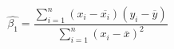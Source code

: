 \documentclass[preview]{standalone}
\begin{document}
\begin{align*}
\hat{\beta_1} = \dfrac{\sum_{i=1}^{n}(x_i - \overline{x_i})(y_i-\overline{y})}{\sum_{i=1}^{n}(x_i-\overline{x})^2}
\end{align*}
\end{document}
